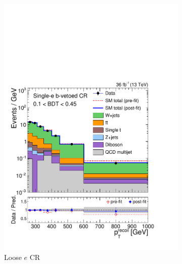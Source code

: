 \begin{figure}[]
\begin{center}
\begin{subfigure}[t]{0.24\textwidth}
            \includegraphics[width=\textwidth]{figures/monotop/postfit/stackedPostfit_singleelectronw_monotop_loose.pdf}
            \caption{Loose $e$ CR}
        \end{subfigure}
        \begin{subfigure}[t]{0.24\textwidth}

\end{subfigure}
\end{center}
\end{figure}
